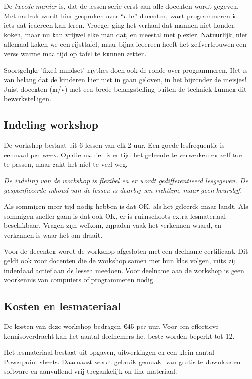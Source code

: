 \documentclass[a4paper,11pt]{article}
\begin{document}
De \emph{tweede manier} is, dat de lessen-serie eerst aan alle docenten wordt gegeven.
Met nadruk wordt hier gesproken over ``alle'' docenten, want programmeren is iets dat iedereen kan leren.
Vroeger ging het verhaal dat mannen niet konden koken, maar nu kan vrijwel elke man dat, en meestal met plezier.
Natuurlijk, niet allemaal koken we een rijsttafel, maar bijna iedereen heeft het zelfvertrouwen een verse warme maaltijd op tafel te kunnen zetten.

Soortgelijke 'fixed mindset' mythes doen ook de ronde over programmeren.
Het is van belang dat de kinderen hier niet in gaan geloven, in het bijzonder de meisjes!
Juist docenten (m/v) met een brede belangstelling buiten de techniek kunnen dit bewerkstelligen.

\subsection*{Indeling workshop}

De workshop bestaat uit 6 lessen van elk 2 uur.
Een goede lesfrequentie is eenmaal per week.
Op die manier is er tijd het geleerde te verwerken en zelf toe te passen, maar zakt het niet te veel weg.

\emph{De indeling van de workshop is flexibel en er wordt gedifferentieerd lesgegeven.
De gespecificeerde inhoud van de lessen is daarbij een richtlijn, maar geen keurslijf.}

Als sommigen meer tijd nodig hebben is dat OK, als het geleerde maar landt.
Als sommigen sneller gaan is dat ook OK, er is ruimschoots extra lesmateriaal beschikbaar.
Vragen zijn welkom, zijpaden vaak het verkennen waard, en verkennen is waar het om draait.

Voor de docenten wordt de workshop afgesloten met een deelname-certificaat.
Dit geldt ook voor docenten die de workshop samen met hun klas volgen, mits zij inderdaad actief aan de lessen meedoen.
Voor deelname aan de workshop is geen voorkennis van computers of programmeren nodig.

\subsection*{Kosten en lesmateriaal}

De kosten van deze workshop bedragen \euro{45} per uur.
Voor een effectieve kennisoverdracht kan het aantal deelnemers het beste worden beperkt tot 12.

Het lesmateriaal bestaat uit opgaven, uitwerkingen en een klein aantal Powerpoint sheets. Daarnaast wordt gebruik gemaakt van gratis te downloaden software en aanvullend vrij toegankelijk on-line materiaal.
\end{document}
